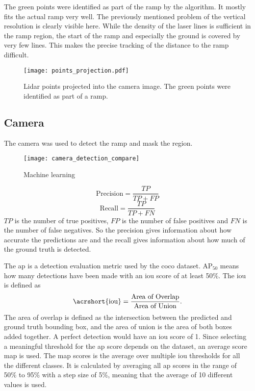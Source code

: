 The green points were identified as part of the ramp by the algorithm.
It mostly fits the actual ramp very well.
The previously mentioned problem of the vertical resolution is clearly visible here.
While the density of the laser lines is sufficient in the ramp region, the start of the ramp and especially the ground is covered by very few lines.
This makes the precise tracking of the distance to the ramp difficult.
\begin{figure}[htbp]
	\centering
	\texttt{[image: points\_projection.pdf]}
	\caption{Lidar points projected into the camera image. The green points were identified as part of a ramp.}
	\label{fig:points_projection}
\end{figure}



\subsection{Camera}
The camera was used to detect the ramp and mask the region.
\begin{figure}[htbp]
	\centering
	\texttt{[image: camera\_detection\_compare]}
	\caption{Machine learning}
	\label{fig:camera_detection_compare}
\end{figure}
\begin{equation}
	\text{Precision} = \frac{TP}{TP+FP}
\end{equation}
\begin{equation}
	\text{Recall} = \frac{TP}{TP+FN}
\end{equation}
$TP$ is the number of true positives, $FP$ is the number of false positives and $FN$ is the number of false negatives.
So the precision gives information about how accurate the predictions are and the recall gives information about how much of the ground truth is detected.

The \gls{ap} is a detection evaluation metric used by the \gls{coco} dataset.
$\text{AP}_{50}$ means how many detections have been made with an \gls{iou} score of at least 50\%.
The \gls{iou} is defined as
\begin{equation}
	\text{\acrshort{iou}} = \frac{\text{Area of Overlap}}{\text{Area of Union}}.
\end{equation}
The area of overlap is defined as the intersection between the predicted and ground truth bounding box, and the area of union is the area of both boxes added together.
A perfect detection would have an \gls{iou} score of 1.
Since selecting a meaningful threshold for the \gls{ap} score depends on the dataset, an average score \gls{map} is used.
The \gls{map} scores is the average over multiple \gls{iou} thresholds for all the different classes.
It is calculated by averaging all \gls{ap} scores in the range of 50\% to 95\% with a step size of 5\%, meaning that the average of 10 different values is used.

